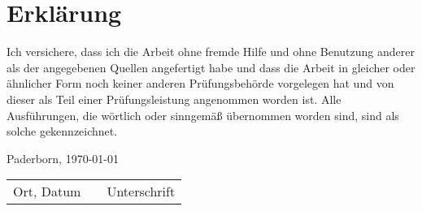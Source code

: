 \chapter*{Erklärung}
	\thispagestyle{empty}
	Ich versichere, dass ich die Arbeit ohne fremde Hilfe und ohne
	Benutzung anderer als der angegebenen Quellen angefertigt habe und dass
	die Arbeit in gleicher oder ähnlicher Form noch keiner anderen
	Prüfungsbehörde vorgelegen hat und von dieser als Teil einer
	Prüfungsleistung angenommen worden ist. Alle Ausführungen, die wörtlich
	oder sinngemäß übernommen worden sind, sind als solche
	gekennzeichnet.\\
	\vspace{27pt}

Paderborn, \today{}
	\begin{center}
		\begin{tabular}{l p{} r}
			\cline{1-1} \cline{3-3}
			\begin{minipage}[t]{0.4\textwidth}
				\centering
				Ort, Datum
			\end{minipage}
			&&  
			\begin{minipage}[t]{0.4\textwidth}
				Unterschrift
			\end{minipage}
	\end{tabular}
\end{center}

